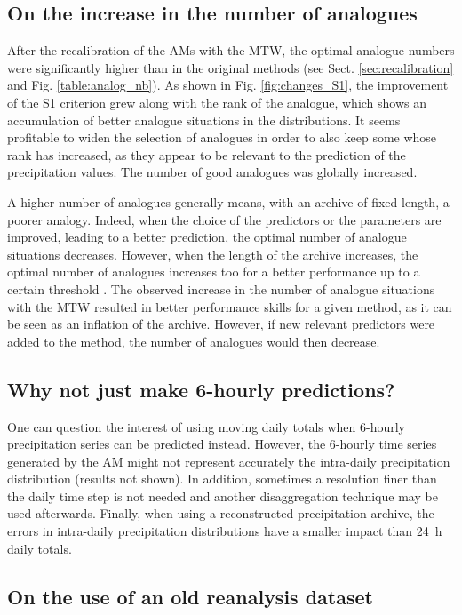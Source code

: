 \documentclass[hess, manuscript]{copernicus}
\begin{document}
	
	\subsection{On the increase in the number of analogues}
	
	After the recalibration of the AMs with the MTW, the optimal analogue numbers were significantly higher than in the original methods (see Sect. \ref{sec:recalibration} and Fig. \ref{table:analog_nb}). As shown in Fig. \ref{fig:changes_S1}, the improvement of the S1 criterion grew along with the rank of the analogue, which shows an accumulation of better analogue situations in the distributions. It seems profitable to widen the selection of analogues in order to also keep some whose rank has increased, as they appear to be relevant to the prediction of the precipitation values. The number of good analogues was globally increased.
	
	A higher number of analogues generally means, with an archive of fixed length, a poorer analogy. Indeed, when the choice of the predictors or the parameters are improved, leading to a better prediction, the optimal number of analogue situations decreases. However, when the length of the archive increases, the optimal number of analogues increases too for a better performance up to a certain threshold \citep[][]{Bontron2004, Hamill2006a}. The observed increase in the number of analogue situations with the MTW resulted in better performance skills for a given method, as it can be seen as an inflation of the archive. However, if new relevant predictors were added to the method, the number of analogues would then decrease.
	
	
	\subsection{Why not just make 6-hourly predictions?}
	
	One can question the interest of using moving daily totals when 6-hourly precipitation series can be predicted instead. However, the 6-hourly time series generated by the AM might not represent accurately the intra-daily precipitation distribution (results not shown). In addition, sometimes a resolution finer than the daily time step is not needed and another disaggregation technique may be used afterwards. Finally, when using a reconstructed precipitation archive, the errors in intra-daily precipitation distributions have a smaller impact than 24~h daily totals.
	
	
	\subsection{On the use of an old reanalysis dataset}
	\label{sec:old_reanalysis}
	
\end{document}
